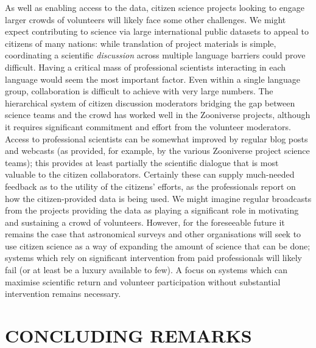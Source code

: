\documentclass{ar2e}
\begin{document}
As well as enabling access to the data, citizen science projects looking to
engage larger crowds of volunteers will likely face some other  challenges. We
might expect contributing to science via large international public datasets to
appeal to citizens of many nations: while translation of project materials is
simple,  coordinating a scientific \textit{discussion} across multiple language
barriers could prove difficult. Having a critical mass of professional
scientists interacting in each language would seem the most important factor.
Even within a single language group, collaboration is difficult to achieve with 
very large numbers. The hierarchical system of citizen discussion  moderators
bridging the gap between science teams and the crowd has worked well in the
Zooniverse projects, although it requires significant commitment and effort from
the volunteer moderators. Access to professional scientists can be somewhat
improved by regular blog posts and  webcasts (as provided, for example, by the
various Zooniverse project science teams);  this provides at least partially the
scientific dialogue that is most valuable to the citizen collaborators.
Certainly these can supply much-needed feedback as to the utility of the
citizens' efforts, as the professionals report on how the citizen-provided data
is being used. We might imagine regular broadcasts from the projects providing
the data as playing a significant role in motivating and sustaining a crowd of
volunteers. However, for the foreseeable future it remains the case that
astronomical surveys and other organisations will seek to use citizen science as
a  way of expanding the amount of science that can be done; systems which rely
on significant intervention from paid professionals will likely fail (or at
least be a luxury available to few). A focus on systems which can maximise
scientific return and volunteer participation without substantial intervention
remains necessary. 


\section{CONCLUDING REMARKS}
\label{sec:conclusions}
\end{document}

